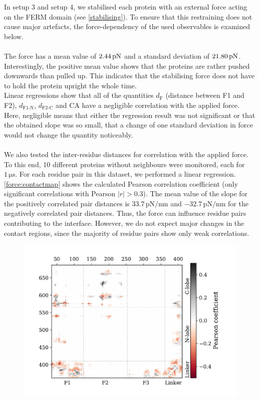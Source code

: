 \label{forceana}
In setup 3 and setup 4, we stabilised each protein with an external force acting on the FERM domain (see \autoref{stabilising}). To ensure that this restraining does not cause major artefacts, the force-dependency of the used observables is examined below.\\
\\
The force has a mean value of $2.44\,\forceunit$ and a standard deviation of $21.80\,\forceunit$. Interestingly, the positive mean value shows that the proteins are rather pushed downwards than pulled up. This indicates that the stabilising force does not have to hold the protein upright the whole time. %
\\
Linear regressions show that all of the quantities $d_\text{F}$ (distance between F1 and F2), $d_\text{F1-N}$, $d_\text{F2-C}$ and CA have a negligible correlation with the applied force. Here, negligible means that either the regression result was not significant or that the obtained slope was so small, that a change of one standard deviation in force would not change the quantity noticeably.\\
\\
We also tested the inter-residue distances for correlation with the applied force. To this end, 10 different proteins without neighbours were monitored, each for $1\,\si{\micro\second}$. For each residue pair in this dataset, we performed a linear regression. \autoref{force:contactmap} shows the calculated Pearson correlation coefficient (only significant correlations with Pearson $\left|r\right| > 0.3$). The mean value of the slope for the positively correlated pair distances is $33.7\,\si{\pico\newton/\nano\metre}$ and $-32.7\,\si{\pico\newton/\nano\metre}$ for the negatively correlated pair distances. Thus, the force can influence residue pairs contributing to the interface. However, we do not expect major changes in the contact regions, since the majority of residue pairs show only weak correlations.\\
%
%
%
\begin{figure}[h]
	\centering
	\includegraphics[width=.7\textwidth]{figures/results/interface_corr}
	\label{force:contactmap}
\end{figure}
